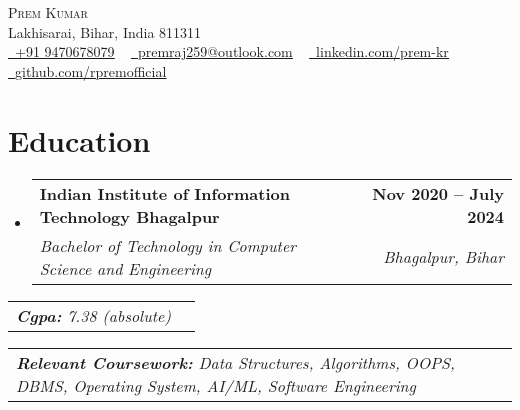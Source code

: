 \documentclass[letterpaper,11pt]{article}
\makeatletter
\newcommand{\resumeSubheading}[4]{
  \vspace{-2pt}\item
    \begin{tabular*}{1.0\textwidth}[t]{l@{\extracolsep{\fill}}r}
      \textbf{#1} & \textbf{\small #2} \\
      \textit{\small#3} & \textit{\small #4} \\
    \end{tabular*}\vspace{-7pt}
}
\newcommand{\collegeItem}[1]{
    \item
    \begin{tabular*}{0.97\textwidth}{l@{\extracolsep{\fill}}r}
      \textit{\small#1} & \textit{\small } \\
    \end{tabular*}\vspace{-4pt}
}
\newcommand{\resumeSubHeadingListStart}{\begin{itemize}[leftmargin=0.0in, label={}]}
\newcommand{\resumeSubHeadingListEnd}{\end{itemize}}
\makeatother
\begin{document}

\begin{center}
    {\Huge \scshape Prem Kumar} \\ \vspace{1pt}
    Lakhisarai, Bihar, India 811311 \\ \vspace{1pt}
    \href{tel:919470678079}{\color{MidnightBlue} \raisebox{-0.2\height}\faPhone\
    \underline {+91 9470678079}} ~ \href{mailto:premraj259@outlook.com}{\color{MidnightBlue} \raisebox{-0.2\height}\faEnvelope\  \underline{premraj259@outlook.com}} ~ 
    \href{https://linkedin.com/in/prem-kr/}{\color{MidnightBlue} \raisebox{-0.2\height}\faLinkedin\ \underline{linkedin.com/prem-kr}}  ~
    \href{https://github.com/}{\color{MidnightBlue} \raisebox{-0.2\height}\faGithub\ \underline{github.com/rpremofficial}}
    \vspace{-8pt}
\end{center}


\section{Education}
  \resumeSubHeadingListStart
    \resumeSubheading
      {Indian Institute of Information Technology Bhagalpur}{Nov 2020 -- July 2024}
      {Bachelor of Technology in Computer Science and Engineering}{Bhagalpur, Bihar}
  \resumeSubHeadingListEnd
  \collegeItemsistStart
  \collegeItem{\textbf{Cgpa:} 7.38 (absolute)}
  \collegeItem{\textbf{Relevant Coursework:} Data Structures, Algorithms, OOPS, DBMS, Operating System, AI/ML, Software Engineering}
  \collegeItemsisEnd
\vspace{-2pt}
  
\end{document}
